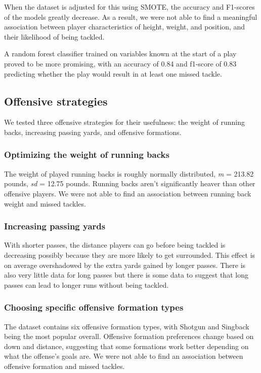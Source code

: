 \documentclass[bibtex, sigconf, hyperref={colorlinks=true,linkcolor=blue,urlcolor=blue}]{acmart}
\begin{document}
When the dataset is adjusted for this using SMOTE, the accuracy and F1-scores
of the models greatly decrease. As a result, we were not able to find a
meaningful association between player characteristics of height, weight, and
position, and their likelihood of being tackled.

A random forest classifier trained on variables known at the start of a play
proved to be more promising, with an accuracy of 0.84 and f1-score of 0.83
predicting whether the play would result in at least one missed tackle.

\subsection{Offensive strategies}

We tested three offensive strategies for their usefulness:
the weight of running backs, increasing passing yards, and offensive formations.

\subsubsection{Optimizing the weight of running backs}

The weight of played running backs is roughly normally distributed, \textit{m} =
213.82 pounds, \textit{sd} = 12.75 pounds. Running backs aren't significantly
heaver than other offensive players. We were not able to find an association
between running back weight and missed tackles.

\subsubsection{Increasing passing yards}

With shorter passes, the distance players can go before being tackled is
decreasing possibly because they are more likely to get surrounded. This effect
is on average overshadowed by the extra yards gained by longer passes.
There is also very little data for long passes but there is some data to suggest
that long passes can lead to longer runs without being tackled.

\subsubsection{Choosing specific offensive formation types}

The dataset contains six offensive formation types, with Shotgun and
Singback being the most popular overall. Offensive formation preferences change
based on down and distance, suggesting that some formations work better
depending on what the offense's goals are. We were not able to find an
association between offensive formation and missed tackles.
\end{document}

